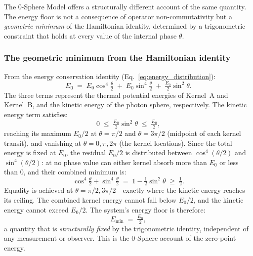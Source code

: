 \documentclass[%
 reprint,
 amsmath,amssymb,
 aps,
 prb,
]{revtex4-2}
\numberwithin{equation}{section}
\theoremstyle{definition}
\theoremstyle{remark}
\begin{document}
The 0-Sphere Model offers a structurally different account of the same quantity. The energy floor is not a consequence of operator non-commutativity but a \emph{geometric minimum} of the Hamiltonian identity, determined by a trigonometric constraint that holds at every value of the internal phase $\theta$.

\subsubsection{The geometric minimum from the Hamiltonian identity}

From the energy conservation identity (Eq.~\ref{eq:energy_distribution}):
\begin{equation}
E_0 \;=\; E_0\cos^4\!\tfrac{\theta}{2} \;+\; E_0\sin^4\!\tfrac{\theta}{2} \;+\; \tfrac{E_0}{2}\sin^2\!\theta.
\label{eq:hamiltonian_zpe}
\end{equation}
The three terms represent the thermal potential energies of Kernel~A and Kernel~B, and the kinetic energy of the photon sphere, respectively. The kinetic energy term satisfies:
\begin{equation}
0 \;\leq\; \tfrac{E_0}{2}\sin^2\!\theta \;\leq\; \tfrac{E_0}{2},
\label{eq:kinetic_bound}
\end{equation}
reaching its maximum $E_0/2$ at $\theta = \pi/2$ and $\theta = 3\pi/2$ (midpoint of each kernel transit), and vanishing at $\theta = 0, \pi, 2\pi$ (the kernel locations). Since the total energy is fixed at $E_0$, the residual $E_0/2$ is distributed between $\cos^4(\theta/2)$ and $\sin^4(\theta/2)$: at no phase value can either kernel absorb more than $E_0$ or less than 0, and their combined minimum is:
\begin{equation}
\cos^4\!\tfrac{\theta}{2} + \sin^4\!\tfrac{\theta}{2}
\;=\; 1 - \tfrac{1}{2}\sin^2\!\theta
\;\geq\; \tfrac{1}{2}.
\label{eq:kernel_floor}
\end{equation}
Equality is achieved at $\theta = \pi/2, 3\pi/2$---exactly where the kinetic energy reaches its ceiling. The combined kernel energy cannot fall below $E_0/2$, and the kinetic energy cannot exceed $E_0/2$. The system's energy floor is therefore:
\begin{equation}
\boxed{E_{\min} \;=\; \tfrac{E_0}{2}},
\label{eq:zpe_geometric}
\end{equation}
a quantity that is \emph{structurally fixed} by the trigonometric identity, independent of any measurement or observer. This is the 0-Sphere account of the zero-point energy.
\end{document}
